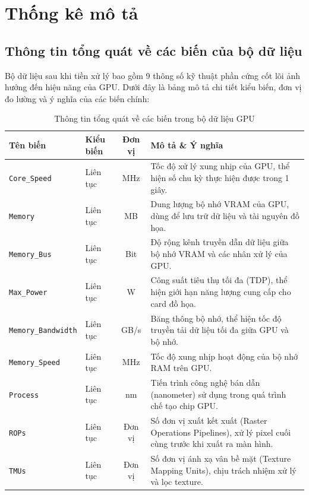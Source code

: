 \section{Thống kê mô tả}

    \subsection{Thông tin tổng quát về các biến của bộ dữ liệu}
        Bộ dữ liệu sau khi tiền xử lý bao gồm 9 thông số kỹ thuật phần cứng cốt lõi ảnh hưởng đến hiệu năng của GPU. Dưới đây là bảng mô tả chi tiết kiểu biến, đơn vị đo lường và ý nghĩa của các biến chính:

        \begin{table}[H]
            \centering
            \renewcommand{\arraystretch}{1.3}
            \begin{tabular}{|l|l|c|p{6.2cm}|}
                \hline
                \textbf{Tên biến} & \textbf{Kiểu biến} & \textbf{Đơn vị} & \textbf{Mô tả \& Ý nghĩa} \\
                \hline
                \texttt{Core\_Speed} & Liên tục & MHz & Tốc độ xử lý xung nhịp của GPU, thể hiện số chu kỳ thực hiện được trong 1 giây. \\
                \hline
                \texttt{Memory} & Liên tục & MB & Dung lượng bộ nhớ VRAM của GPU, dùng để lưu trữ dữ liệu và tài nguyên đồ họa. \\
                \hline
                \texttt{Memory\_Bus} & Liên tục & Bit & Độ rộng kênh truyền dẫn dữ liệu giữa bộ nhớ VRAM và các nhân xử lý của GPU. \\
                \hline
                \texttt{Max\_Power} & Liên tục & W & Công suất tiêu thụ tối đa (TDP), thể hiện giới hạn năng lượng cung cấp cho card đồ họa. \\
                \hline
                \texttt{Memory\_Bandwidth} & Liên tục & GB/s & Băng thông bộ nhớ, thể hiện tốc độ truyền tải dữ liệu tối đa giữa GPU và bộ nhớ. \\
                \hline
                \texttt{Memory\_Speed} & Liên tục & MHz & Tốc độ xung nhịp hoạt động của bộ nhớ RAM trên GPU. \\
                \hline
                \texttt{Process} & Liên tục & nm & Tiến trình công nghệ bán dẫn (nanometer) sử dụng trong quá trình chế tạo chip GPU. \\
                \hline
                \texttt{ROPs} & Liên tục & Đơn vị & Số đơn vị xuất kết xuất (Raster Operations Pipelines), xử lý pixel cuối cùng trước khi xuất ra màn hình. \\
                \hline
                \texttt{TMUs} & Liên tục & Đơn vị & Số đơn vị ánh xạ vân bề mặt (Texture Mapping Units), chịu trách nhiệm xử lý và lọc texture. \\
                \hline
            \end{tabular}
            \caption{Thông tin tổng quát về các biến trong bộ dữ liệu GPU}
            \label{tab:thong_tin_bien}
        \end{table}

